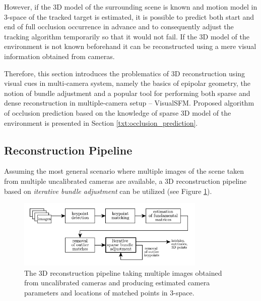 However, if the 3D model of the surrounding scene is known and motion model in 3-space of the tracked target is estimated, it is possible to predict both start and end of full occlusion occurrence in advance and to consequently adjust the tracking algorithm temporarily so that it would not fail. If the 3D model of the environment is not known beforehand it can be reconstructed using a mere visual information obtained from cameras.

Therefore, this section introduces the problematics of 3D reconstruction using visual cues in multi-camera system, namely the basics of epipolar geometry, the notion of bundle adjustment and a popular tool for performing both sparse and dense reconstruction in multiple-camera setup -- VisualSFM. Proposed algorithm of occlusion prediction based on the knowledge of sparse 3D model of the environment is presented in Section \ref{txt:occlusion_prediction}. 

\subsection{Reconstruction Pipeline} \label{txt:reconstruction_pipeline}

Assuming the most general scenario where multiple images of the scene taken from multiple uncalibrated cameras are available, a 3D reconstruction pipeline based on \textit{iterative bundle adjustment} can be utilized \cite{Snavely:2006:PTE:1179352.1141964} (see Figure \ref{fig:3d_reconstruction_pipeline}).

\begin{figure}[tbh]
	\centering
	\includegraphics[width=0.8\textwidth]{fig/3d_reconstruction_pipeline.pdf}
	\caption{The 3D reconstruction pipeline taking multiple images obtained from uncalibrated cameras and producing estimated camera parameters and locations of matched points in 3-space.}
	\label{fig:3d_reconstruction_pipeline}
\end{figure}

